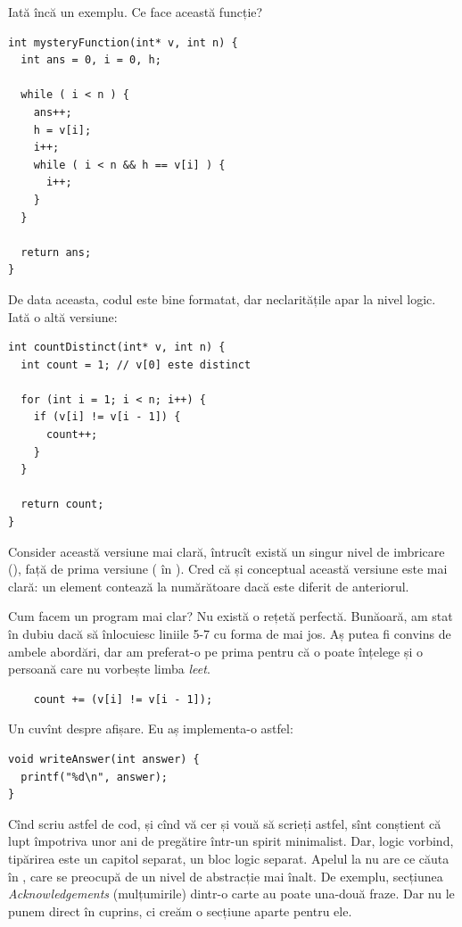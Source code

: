 \documentclass[../main.tex]{subfiles}
\begin{document}
Iată încă un exemplu. Ce face această funcție?

\begin{verbatim}
int mysteryFunction(int* v, int n) {
  int ans = 0, i = 0, h;

  while ( i < n ) {
    ans++;
    h = v[i];
    i++;
    while ( i < n && h == v[i] ) {
      i++;
    }
  }

  return ans;
}
\end{verbatim}

De data aceasta, codul este bine formatat, dar neclaritățile apar la nivel logic. Iată o altă versiune:

\begin{verbatim}
int countDistinct(int* v, int n) {
  int count = 1; // v[0] este distinct

  for (int i = 1; i < n; i++) {
    if (v[i] != v[i - 1]) {
      count++;
    }
  }

  return count;
}
\end{verbatim}

Consider această versiune mai clară, întrucît există un singur nivel de imbricare (), față de prima versiune ( în ). Cred că și conceptual această versiune este mai clară: un element contează la numărătoare dacă este diferit de anteriorul.

Cum facem un program mai clar? Nu există o rețetă perfectă. Bunăoară, am stat în dubiu dacă să înlocuiesc liniile 5-7 cu forma de mai jos. Aș putea fi convins de ambele abordări, dar am preferat-o pe prima pentru că o poate înțelege și o persoană care nu vorbește limba \textit{leet}.

\begin{verbatim}
    count += (v[i] != v[i - 1]);
\end{verbatim}

Un cuvînt despre afișare. Eu aș implementa-o astfel:

\begin{verbatim}
void writeAnswer(int answer) {
  printf("%d\n", answer);
}
\end{verbatim}

Cînd scriu astfel de cod, și cînd vă cer și vouă să scrieți astfel, sînt conștient că lupt împotriva unor ani de pregătire într-un spirit minimalist. Dar, logic vorbind, tipărirea este un capitol separat, un bloc logic separat. Apelul la  nu are ce căuta în , care se preocupă de un nivel de abstracție mai înalt. De exemplu, secțiunea \textit{Acknowledgements} (mulțumirile) dintr-o carte au poate una-două fraze. Dar nu le punem direct în cuprins, ci creăm o secțiune aparte pentru ele.
\end{document}
